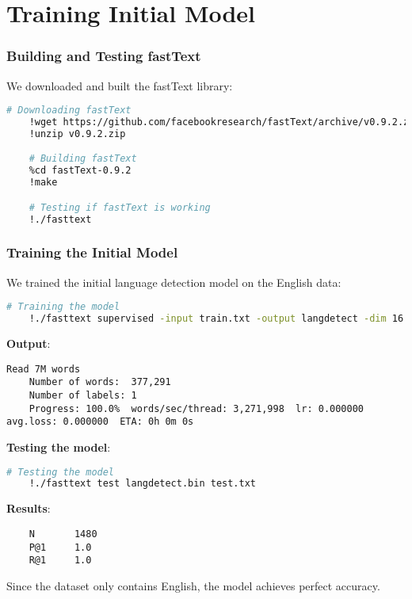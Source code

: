 \documentclass{beamer}
\begin{document}
\section{Training Initial Model}

\begin{frame}[fragile]
    \frametitle{Building and Testing fastText}
    We downloaded and built the fastText library:

    \begin{lstlisting}[language=bash]
    # Downloading fastText
    !wget https://github.com/facebookresearch/fastText/archive/v0.9.2.zip
    !unzip v0.9.2.zip

    # Building fastText
    %cd fastText-0.9.2
    !make

    # Testing if fastText is working
    !./fasttext
    \end{lstlisting}
\end{frame}

\begin{frame}[fragile]
    \frametitle{Training the Initial Model}
    We trained the initial language detection model on the English data:

    \begin{lstlisting}[language=bash]
    # Training the model
    !./fasttext supervised -input train.txt -output langdetect -dim 16
    \end{lstlisting}

    \textbf{Output}:
    \begin{lstlisting}[basicstyle=\ttfamily\scriptsize]
    Read 7M words
    Number of words:  377,291
    Number of labels: 1
    Progress: 100.0%  words/sec/thread: 3,271,998  lr: 0.000000  avg.loss: 0.000000  ETA: 0h 0m 0s
    \end{lstlisting}

    \textbf{Testing the model}:

    \begin{lstlisting}[language=bash]
    # Testing the model
    !./fasttext test langdetect.bin test.txt
    \end{lstlisting}

    \textbf{Results}:
    \begin{lstlisting}
    N       1480
    P@1     1.0
    R@1     1.0
    \end{lstlisting}

    Since the dataset only contains English, the model achieves perfect accuracy.
\end{frame}
\end{document}
